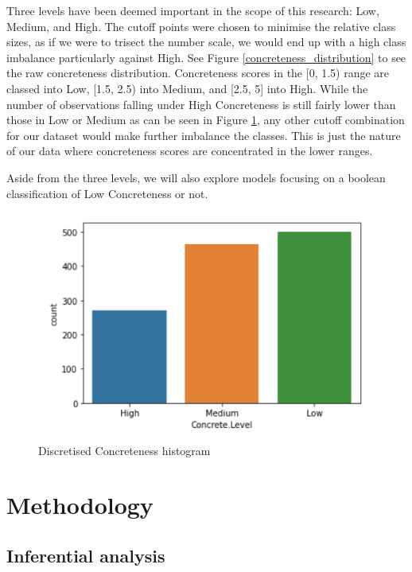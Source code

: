 \documentclass[12pt, a4paper]{article}
\begin{document}
Three levels have been deemed important in the scope of this research: Low, Medium, and High. The cutoff points were chosen to minimise the relative class sizes, as if we were to trisect the number scale, we would end up with a high class imbalance particularly against High. See Figure \ref{concreteness_distribution} to see the raw concreteness distribution. Concreteness scores in the [0, 1.5) range are classed into Low, [1.5, 2.5) into Medium, and [2.5, 5] into High. While the number of observations falling under High Concreteness is still fairly lower than those in Low or Medium as can be seen in Figure \ref{concreteness_discrete_distribution}, any other cutoff combination for our dataset would make further imbalance the classes. This is just the nature of our data where concreteness scores are concentrated in the lower ranges.

Aside from the three levels, we will also explore models focusing on a boolean classification of Low Concreteness or not. 

\begin{figure}
\centerline{\includegraphics[scale=0.8]{concreteness_discrete_distribution.png}}
\caption{Discretised Concreteness histogram}
\label{concreteness_discrete_distribution}
\end{figure}

\section{Methodology}

\subsection{Inferential analysis}
\end{document}
